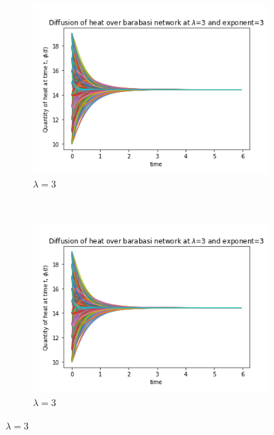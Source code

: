 \documentclass[10pt,a4paper]{article}
\begin{document}
\begin{enumerate}[i)]
\begin{figure}[H]
\begin{subfigure}[b]{0.45\textwidth}
    	    			\includegraphics[width= \textwidth]{images/BA-lam3-laplace.png}
    	    			\caption{$\lambda=3$}
    	    		\end{subfigure}~
    	    		\begin{subfigure}[b]{0.45\textwidth}
    	    			\includegraphics[width= \textwidth]{images/BA-lam3-laplace.png}
    	    			\caption{$\lambda=3$}
    	    		\end{subfigure}
    	    	\end{figure}
				

\end{enumerate}
\end{document}
